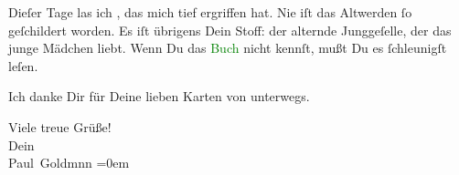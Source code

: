 \pstart
           Dieſer Tage las ich \label{K_L03213-3v}\label{K_L03213-3h}, das mich tief ergriffen hat. Nie iſt das Altwerden ſo geſchildert
               worden. {\pb}Es iſt übrigens Dein Stoff: der alternde
               Junggeſelle, der das junge Mädchen  liebt. Wenn
               Du das \textcolor{green}{Buch}{}\ledrightnote{{$\rightarrow$}\textcolor{green}{Fort comme la mort}} nicht kennſt, mußt
               Du es ſchleunigſt leſen.\pend
           
\pstart
           Ich danke Dir für Deine lieben Karten \strikeout{\textcolor{gray}{aus}} von unterwegs.\pend
           
\pstart
           Viele treue Grüße!{\\[\baselineskip]}Dein{\\[\baselineskip]}\spacefill\mbox{Paul Goldmnn}\pend
           \leftskip=0em{}\endnumbering{}  
      